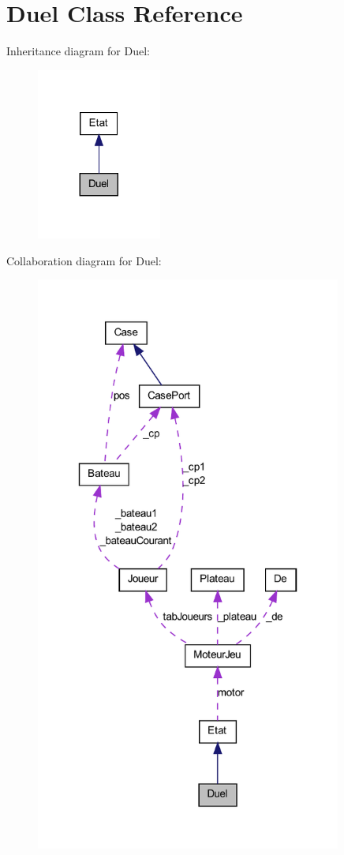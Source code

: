 \hypertarget{class_duel}{
\section{Duel Class Reference}
\label{class_duel}
}


Inheritance diagram for Duel:
\nopagebreak
\begin{figure}[H]
\begin{center}
\leavevmode
\includegraphics[width=116pt]{class_duel__inherit__graph}
\end{center}
\end{figure}


Collaboration diagram for Duel:
\nopagebreak
\begin{figure}[H]
\begin{center}
\leavevmode
\includegraphics[width=285pt]{class_duel__coll__graph}
\end{center}
\end{figure}

